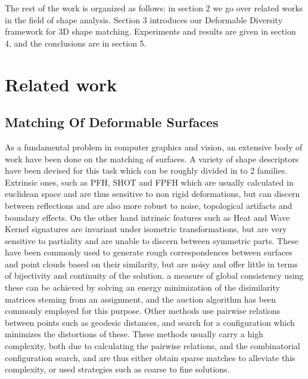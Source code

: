 \documentclass[10pt,twocolumn,letterpaper]{article}
\begin{document}
The rest of the work is organized as follows: in section 2 we go over related works in the field of shape analysis. Section 3 introduces our Deformable Diversity framework for 3D shape matching. Experiments and results are given in section 4, and the conclusions are in section 5.


\section{Related work}
\label{chap:related work}


\subsection{Matching Of Deformable Surfaces}
As a fundamental problem in computer graphics and vision, an extensive body of work have been done on the matching of surfaces.
A variety of shape descriptors have been devised for this task which can be roughly divided in to 2 families. 
Extrinsic ones, such as PFH\cite{rusu2008learning}, SHOT\cite{tombari2010unique} and FPFH\cite{rusu2009fast} which are usually calculated in euclidean space and are thus sensitive to non rigid deformations, but can discern between reflections and are also more robust to noise, topological artifacts and boundary effects.
On the other hand intrinsic features such as Heat\cite{bronstein2010scale} and Wave Kernel signatures\cite{aubry2011wave} are invariant under isometric transformations, but are very sensitive to partiality and are unable to discern between symmetric parts.
These have been commonly used to generate rough correspondences between surfaces and point clouds based on their similarity, but are noisy and offer little in terms of bijectivity and continuity of the solution. a measure of global consistency using these can be achieved by solving an energy minimization of the disimilarity matrices steming from an assignment, and the auction algorithm has been commonly employed for this purpose.
Other methods use pairwise relations between points such as geodesic distances\cite{sahilliouglu2012minimum,sahilliouglu2012scale,sahillioǧlu2011coarse}, and search for a configuration which minimizes the distortions of these. These methods usually carry a high complexity, both due to calculating the pairwise relations, and the combinatorial configuration search, and are thus either obtain sparse matches\cite{sahilliouglu2012minimum,sahilliouglu2012scale,sahillioǧlu2011coarse} to alleviate this complexity, or used strategies such as coarse to fine solutions.
\end{document}
